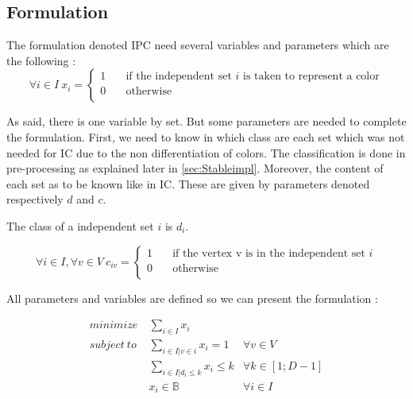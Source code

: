 \subsection{Formulation}

The formulation denoted IPC need several variables and parameters which are the following : \\

\[ \forall i \in I\ x_{i} =
  \begin{cases}
    1       & \quad \text{if the independent set $i$ is taken to represent a color}  \\
    0  		& \quad \text{otherwise }\\
  \end{cases}
\]

As said, there is one variable by set. But some parameters are needed to complete the formulation. First, we need to know in which class are each set which was not needed for IC due to the non differentiation of colors. The classification is done in pre-processing as explained later in \ref{sec:Stableimpl}. Moreover, the content of each set as to be known like in IC. These are given by parameters denoted respectively $d$ and $c$.

\begin{comment}
\[ \forall i \in I, \forall k \in [1;D]\ d_{i,k} =
  \begin{cases}
    1       & \quad \text{if the independent set $i$ is in class $I_{k}$}  \\
    0  		& \quad \text{otherwise }\\
  \end{cases}
\]
\end{comment}


The class  of a independent set $i$ is $d_i$.

\[ \forall i \in I, \forall v \in V\ c_{iv} =
  \begin{cases}
    1       & \quad \text{if the vertex v is in the independent set $i$}  \\
    0  		& \quad \text{otherwise }\\
  \end{cases}
\]

All parameters and variables are defined so we can present the formulation :

\begin{eqnarray}
minimize\ &  \displaystyle\sum_{i \in I} x_i & \label{IPC:FE}\\
subject\ to &   \displaystyle\sum_{i \in I | v \in i}{x_{i}} = 1   & \forall v \in V  \label{IPC:C1}\\
			&   \displaystyle\sum_{i \in I | d_{i} \leq k }{x_{i}} \leq k    & \forall k \in [1;D-1]  \label{IPC:C2}\\
&  x_{i} \in \mathbb{B} &  \forall i \in I
\end{eqnarray}

